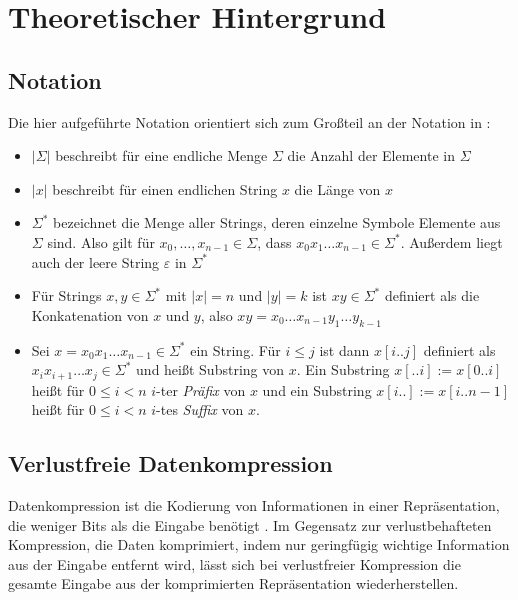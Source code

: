 \chapter{Theoretischer Hintergrund}
\label{theorie}

\section{Notation}

Die hier aufgeführte Notation orientiert sich zum Großteil an der Notation in \cite{kieffer_grammar-based_2000}:
\begin{itemize}
	\item $|\Sigma|$ beschreibt für eine endliche Menge $\Sigma$ die Anzahl der Elemente in $\Sigma$
	\item $|x|$ beschreibt für einen endlichen String $x$ die Länge von $x$
	\item $\Sigma^*$ bezeichnet die Menge aller Strings, deren einzelne Symbole Elemente aus $\Sigma$ sind. Also gilt für $x_0, \dots, x_{n-1} \in \Sigma$, dass $x_0 x_1 \dots x_{n-1} \in \Sigma^*$. Außerdem liegt auch der leere String $\varepsilon$ in $\Sigma^*$
	\item Für Strings $x, y \in \Sigma^*$ mit $|x| = n$ und $|y| = k$ ist $xy \in \Sigma^*$ definiert als die Konkatenation von $x$ und $y$, also $xy = x_0 \dots x_{n-1} y_1 \dots y_{k-1}$ 
	\item Sei $x = x_0 x_1 \dots x_{n-1} \in \Sigma^*$ ein String. Für $i \leq j$ ist dann $x[i..j]$ definiert als $x_i x_{i+1} \dots x_j \in \Sigma^*$ und heißt Substring von $x$. Ein Substring $x[..i] := x[0..i]$ heißt für $0 \leq i < n$ $i$-ter \emph{Präfix} von $x$ und ein Substring $x[i..] := x[i..n - 1]$ heißt für $0 \leq i < n$ $i$-tes \emph{Suffix} von $x$.
\end{itemize}

\section{Verlustfreie Datenkompression}

Datenkompression ist die Kodierung von Informationen in einer Repräsentation, die weniger Bits als die Eingabe benötigt \cite{mahdi_implementing_2012}. 
Im Gegensatz zur verlustbehafteten Kompression, die Daten komprimiert, indem nur geringfügig wichtige Information aus der Eingabe entfernt wird, lässt sich bei verlustfreier Kompression die gesamte Eingabe aus der komprimierten Repräsentation wiederherstellen. 


